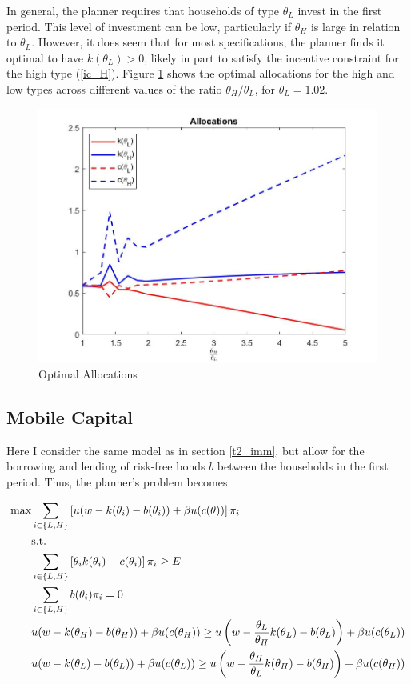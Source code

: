 \documentclass[11pt]{article}
\begin{document}
In general, the planner requires that households of type \( \theta_L \) invest in the first period. This level of investment can be low, particularly if \( \theta_H \) is large in relation to \( \theta_L \). However, it does seem that for most specifications, the planner finds it optimal to have \( k(\theta_L) > 0 \), likely in part to satisfy the incentive constraint for the high type (\ref{ic_H}). Figure \ref{fig_imm} shows the optimal allocations for the high and low types across different values of the ratio \( \theta_H / \theta_L \), for \( \theta_L = 1.02 \). 
%
\begin{figure}[!ht]
    \centering
    \includegraphics[scale = 0.5]{figures/immob.jpg}
    \caption{Optimal Allocations}
    \label{fig_imm}
\end{figure}

\subsection{Mobile Capital} \label{t2_mob}

Here I consider the same model as in section \ref{t2_imm}, but allow for the borrowing and lending of risk-free bonds \( b \) between the households in the first period. Thus, the planner's problem becomes

\begin{align}
    \max &\sum_{i \in\{L,H\}}\left[ u(w - k(\theta_i) - b(\theta_i)) + \beta u(c(\theta)) \right]\pi_i \\ 
    &\text{s.t.} \notag \\
    &\sum_{i \in\{L,H\}}\left[ \theta_i k(\theta_i) - c(\theta_i) \right]\pi_i \ge E \\
    &\sum_{i \in\{L,H\}}b(\theta_i)\pi_i = 0 \\ 
    &u(w - k(\theta_H) - b(\theta_H)) + \beta u(c(\theta_H)) \ge u\left( w - \frac{\theta_L}{\theta_H}k(\theta_L) - b(\theta_L)\right) + \beta u(c(\theta_L)) \label{ic1_mob} \\
    &u(w - k(\theta_L) - b(\theta_L)) + \beta u(c(\theta_L)) \ge u\left( w - \frac{\theta_H}{\theta_L}k(\theta_H) - b(\theta_H) \right) + \beta u(c(\theta_H)) \label{ic2_mob}  
\end{align}
\end{document}
